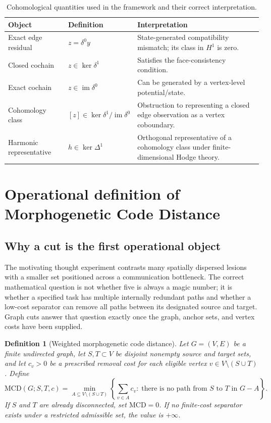 \documentclass[12pt,a4paper]{article}
\newtheorem{definition}{Definition}[section]
\newcommand{\MCD}{\mathrm{MCD}}
\DeclareMathOperator{\im}{im}
\begin{document}
\begin{table}[H]
\centering\small
\caption{Cohomological quantities used in the framework and their correct interpretation.}
\begin{tabularx}{\textwidth}{p{}p{}X}
\toprule
Object & Definition & Interpretation\\
\midrule
Exact edge residual & \(z=\delta^0 y\) & State-generated compatibility mismatch; its class in \(H^1\) is zero.\\
Closed cochain & \(z\in\ker\delta^1\) & Satisfies the face-consistency condition.\\
Exact cochain & \(z\in\im\delta^0\) & Can be generated by a vertex-level potential/state.\\
Cohomology class & \([z]\in\ker\delta^1/\im\delta^0\) & Obstruction to representing a closed edge observation as a vertex coboundary.\\
Harmonic representative & \(h\in\ker\Delta^1\) & Orthogonal representative of a cohomology class under finite-dimensional Hodge theory.\\
\bottomrule
\end{tabularx}
\end{table}

\section{Operational definition of Morphogenetic Code Distance}
\subsection{Why a cut is the first operational object}
The motivating thought experiment contrasts many spatially dispersed lesions with a smaller set positioned across a communication bottleneck. The correct mathematical question is not whether five is always a magic number; it is whether a specified task has multiple internally redundant paths and whether a low-cost separator can remove all paths between its designated source and target. Graph cuts answer that question exactly once the graph, anchor sets, and vertex costs have been supplied.

\begin{definition}[Weighted morphogenetic code distance]
Let \(G=(V,E)\) be a finite undirected graph, let \(S,T\subset V\) be disjoint nonempty source and target sets, and let \(c_v>0\) be a prescribed removal cost for each eligible vertex \(v\in V\setminus(S\cup T)\). Define
\[
\MCD(G;S,T,c)=\min_{A\subseteq V\setminus(S\cup T)}\left\{\sum_{v\in A}c_v:\;\text{there is no path from }S\text{ to }T\text{ in }G-A\right\}.
\tag{11}\label{eq:mcd}
\]
If \(S\) and \(T\) are already disconnected, set \(\MCD=0\). If no finite-cost separator exists under a restricted admissible set, the value is \(+\infty\).
\end{definition}
\end{document}
